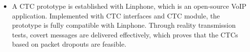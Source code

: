 \begin{englishabstract}
\begin{itemize}
   \item A CTC prototype is established with Linphone, which is an open-source VoIP application. Implemented with CTC interfaces and CTC module, the prototype is fully compatible with Linphone. Through reality transmission tests, covert messages are delivered effectively, which proves that the CTCs based on packet dropouts are feasible.

\end{itemize}

\end{englishabstract}
